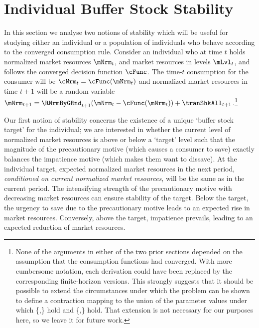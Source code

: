 \documentclass[BufferStockTheory]{subfiles}
\begin{document}
\hypertarget{Analysis of the Converged Consumption Function}{}
\section{Individual Buffer Stock Stability}\label{sec:individStability}






In this section we analyse two notions of stability which will be useful for studying either an individual or a population of individuals who behave according to the converged consumption rule.
Consider an individual who at time $t$ holds normalized market resources $\mNrm_{t}$, and market resources in levels $\mLvl_{t}$, and follows the converged decision function $\cFunc$.
The time-$t$ consumption for the consumer will be $\cNrm_{t} = \cFunc(\mNrm_{t})$ and normalized market resources in time $t+1$ will be a random variable $\mNrm_{t+1} = \RNrmByGRnd_{t+1}(\mNrm_{t} - \cFunc(\mNrm_{t})) + \tranShkAll_{t+1}$.\footnote{None of the arguments in either of the two prior sections depended on the assumption that the consumption functions had converged.
With more cumbersome notation, each derivation could have been replaced by the corresponding finite-horizon versions.
This strongly suggests that it should be possible to extend the circumstances under which the problem can be shown to define a contraction mapping to the union of the parameter values under which \{\RIC,\FHWC\} hold and \{\FVAC,\WRIC\} hold.
That extension is not necessary for our purposes here, so we leave it for future work.}


Our first notion of stability concerns the existence of a unique `buffer stock target' for the individual; we are interested in whether the current level of normalized market resources is above or below a `target' level such that the magnitude of the precautionary motive (which causes a consumer to save) exactly balances the impatience motive  (which makes them want to dissave).
At the individual target, expected normalized market resources in the next period, \textit{conditioned on current normalized market resources}, will be the same as in the current period.
The intensifying strength of the precautionary motive with decreasing market resources can ensure stability of the target.
Below the target, the urgency to save due to the precautionary motive leads to an expected rise in market resources.
Conversely, above the target, impatience prevails, leading to an expected reduction of market resources.
\end{document}
